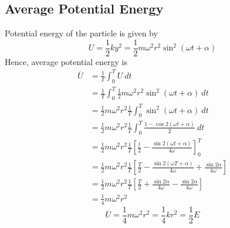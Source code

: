 \documentclass[12pt]{article}
\begin{document}
\subsection{Average Potential Energy}
Potential energy of the particle is given by
\begin{equation}
    U = \frac{1}{2} k y^2 = \frac{1}{2} m \omega^2 r^2 \sin^2{(\omega t + \alpha)}
\end{equation}
Hence, average potential energy is
\begin{align*}
    \overline{U} &= \frac{1}{T} \int_{0}^{T} U \: dt \\
    &= \frac{1}{T} \int_{0}^{T} \frac{1}{2} m \omega^2 r^2 \sin^2{(\omega t + \alpha)} \: dt \\
    &= \frac{1}{2} m \omega^2 r^2 \frac{1}{T} \int_{0}^{T} \sin^2{(\omega t + \alpha)} \: dt \\
    &= \frac{1}{2} m \omega^2 r^2 \frac{1}{T} \int_{0}^{T} \frac{1 - \cos{2(\omega t + \alpha)}}{2} \: dt \\
    &= \frac{1}{2} m \omega^2 r^2 \frac{1}{T} \left[ \frac{t}{2} - \frac{\sin{2(\omega t + \alpha)}}{4\omega} \right]_{0}^{T} \\
    &= \frac{1}{2} m \omega^2 r^2 \frac{1}{T} \left[ \frac{T}{2} - \frac{\sin{2(\omega T + \alpha)}}{4\omega} + \frac{\sin{2\alpha}}{4\omega} \right] \\
    &= \frac{1}{2} m \omega^2 r^2 \frac{1}{T} \left[ \frac{T}{2} + \frac{\sin{2\alpha}}{4\omega} - \frac{\sin{2\alpha}}{4\omega} \right] \\
    &= \frac{1}{4} m \omega^2 r^2
\end{align*}
\begin{equation}
    \boxed{ \overline{U} = \frac{1}{4} m \omega^2 r^2 = \frac{1}{4}k r^2 = \frac{1}{2} E }
\end{equation}
\end{document}
